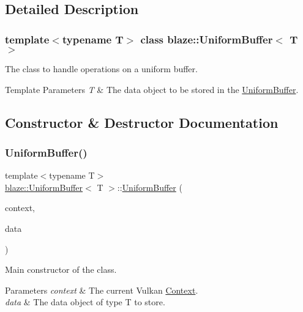 \subsection{Detailed Description}
\subsubsection*{template$<$typename T$>$\newline
class blaze\+::\+Uniform\+Buffer$<$ T $>$}

The class to handle operations on a uniform buffer. 


\begin{DoxyTemplParams}{Template Parameters}
{\em T} & The data object to be stored in the \hyperlink{classblaze_1_1UniformBuffer}{Uniform\+Buffer}. \\
\hline
\end{DoxyTemplParams}


\subsection{Constructor \& Destructor Documentation}
\mbox{\label{classblaze_1_1UniformBuffer_a96dde441b0d31fb0949a864c139c072c}} 
\subsubsection{\texorpdfstring{Uniform\+Buffer()}{UniformBuffer()}}
{\footnotesize\ttfamily template$<$typename T$>$ \\
\hyperlink{classblaze_1_1UniformBuffer}{blaze\+::\+Uniform\+Buffer}$<$ T $>$\+::\hyperlink{classblaze_1_1UniformBuffer}{Uniform\+Buffer} (\begin{DoxyParamCaption}\item[{const \hyperlink{classblaze_1_1Context}{Context} \&}]{context,  }\item[{const T \&}]{data }\end{DoxyParamCaption})\hspace{0.3cm}{\ttfamily [inline]}}



Main constructor of the class. 


\begin{DoxyParams}{Parameters}
{\em context} & The current Vulkan \hyperlink{classblaze_1_1Context}{Context}. \\
\hline
{\em data} & The data object of type T to store. \\
\hline
\end{DoxyParams}


